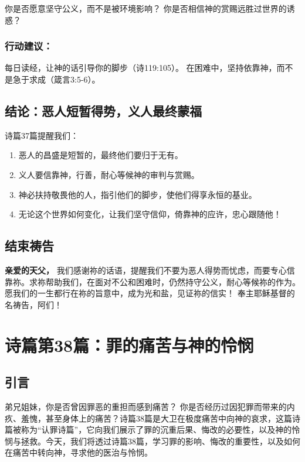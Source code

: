 \documentclass[a4paper, 12pt]{article}
\begin{document}
你是否愿意坚守公义，而不是被环境影响？
你是否相信神的赏赐远胜过世界的诱惑？
\subsubsection*{行动建议：}

每日读经，让神的话引导你的脚步（诗119:105）。
在困难中，坚持依靠神，而不是急于求成（箴言3:5-6）。
\subsection*{结论：恶人短暂得势，义人最终蒙福}
诗篇37篇提醒我们：
\begin{enumerate}
    \item 恶人的昌盛是短暂的，最终他们要归于无有。

    \item 义人要信靠神，行善，耐心等候神的审判与赏赐。

    \item 神必扶持敬畏他的人，指引他们的脚步，使他们得享永恒的基业。

    \item 无论这个世界如何变化，让我们坚守信仰，倚靠神的应许，忠心跟随他！

\end{enumerate}

\subsection*{结束祷告}
\textbf{亲爱的天父，}
我们感谢祢的话语，提醒我们不要为恶人得势而忧虑，而要专心信靠祢。求祢帮助我们，在面对不公和困难时，仍然持守公义，耐心等候祢的作为。愿我们的一生都行在祢的旨意中，成为光和盐，见证祢的信实！
奉主耶稣基督的名祷告，阿们！
\newpage
\section{诗篇第38篇：罪的痛苦与神的怜悯}
\subsection*{引言}
弟兄姐妹，你是否曾因罪恶的重担而感到痛苦？ 你是否经历过因犯罪而带来的内疚、羞愧，甚至身体上的痛苦？诗篇38篇是大卫在极度痛苦中向神的哀求，这篇诗篇被称为“认罪诗篇”，它向我们展示了罪的沉重后果、悔改的必要性，以及神的怜悯与拯救。今天，我们将透过诗篇38篇，学习罪的影响、悔改的重要性，以及如何在痛苦中转向神，寻求他的医治与怜悯。
\end{document}
